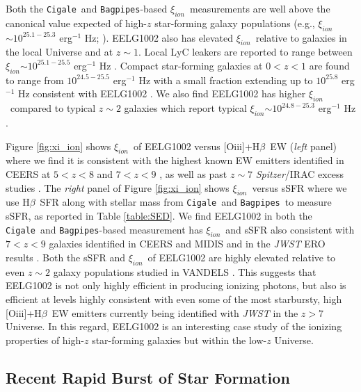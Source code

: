 \documentclass[twocolumn,tight,times,linenumbers]{aastex631}
\newcommand{\hbeta}{H$\beta$}
\newcommand{\oiii}{[O{\sc iii}]}
\newcommand{\xiion}{$\xi_{ion}$}
\newcommand{\cigale}{\texttt{Cigale}}
\newcommand{\bagpipes}{\texttt{Bagpipes}}
\begin{document}
		Both the \cigale~and \bagpipes-based \xiion~measurements are well above the canonical value expected of high-$z$ star-forming galaxy populations (e.g., \xiion~$\sim 10^{25.1 - 25.3}$ erg$^{-1}$ Hz; \citealt{Robertson2013}). EELG1002 also has elevated \xiion~relative to galaxies in the local Universe and at $z \sim 1$. Local LyC leakers are reported to range between \xiion$ \sim 10^{25.1 - 25.5}$ erg$^{-1}$ Hz \citep{Schaerer2016}. Compact star-forming galaxies at $0 < z < 1$ are found to range from $10^{24.5 - 25.5}$ erg$^{-1}$ Hz with a small fraction extending up to $10^{25.8}$ erg$^{-1}$ Hz consistent with EELG1002 \citep{Izotov2017}. We also find EELG1002 has higher \xiion~compared to typical $z \sim 2$ galaxies which report typical \xiion $\sim 10^{24.8 - 25.3}$ erg$^{-1}$ Hz \citep{Matthee2017,Shivaei2018}.
		
		Figure \ref{fig:xi_ion} shows \xiion~of EELG1002 versus \oiii+\hbeta~EW (\textit{left} panel) where we find it is consistent with the highest known EW emitters identified in CEERS at $5  < z < 8$  \citep{Chen2024} and $7 < z < 9$ \citep{Tang2023}, as well as past $z \sim 7$ \textit{Spitzer}/IRAC excess studies \citep{Endsley2021}. The \textit{right} panel of Figure \ref{fig:xi_ion} shows \xiion~versus sSFR where we use \hbeta~SFR along with stellar mass from \cigale~and \bagpipes~to measure sSFR, as reported in Table \ref{table:SED}. We find EELG1002 in both the \cigale~and \bagpipes-based measurement has \xiion~and sSFR also consistent with $7 < z < 9$ galaxies identified in CEERS \citep{Whitler2024} and MIDIS \citep{Rinaldi2023} and in the \textit{JWST} ERO results \citep{Sun2023}. Both the sSFR and \xiion~of EELG1002 are highly elevated relative to even $z \sim 2$ galaxy populations studied in VANDELS \citep{Castellano2023}. This suggests that EELG1002 is not only highly efficient in producing ionizing photons, but also is efficient at levels highly consistent with even some of the most starbursty, high \oiii+\hbeta~EW emitters currently being identified with \textit{JWST} in the $ z> 7$ Universe. In this regard, EELG1002 is an interesting case study of the ionizing properties of high-$z$ star-forming galaxies but within the low-$z$ Universe.
		

		\subsection{Recent Rapid Burst of Star Formation}
		\label{sec:sfh}
		
\end{document}
